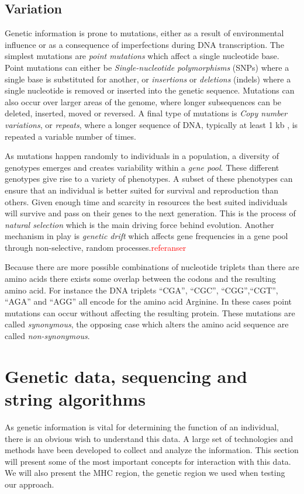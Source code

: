 \documentclass[thesis.tex]{subfiles}
\begin{document}
\subsection{Variation}
\label{sec:genetic_variation}
Genetic information is prone to mutations, either as a result of environmental influence or as a consequence of imperfections during DNA transcription. The simplest mutations are \textit{point mutations} which affect a single nucleotide base. Point mutations can either be \textit{Single-nucleotide polymorphisms} (SNPs) where a single base is substituted for another, or \textit{insertions} or \textit{deletions} (indels) where a single nucleotide is removed or inserted into the genetic sequence. Mutations can also occur over larger areas of the genome, where longer subsequences can be deleted, inserted, moved or reversed. A final type of mutations is \textit{Copy number variations}, or \textit{repeats}, where a longer sequence of DNA, typically at least 1 kb \cite{copy_number_variation_new_insights_in_genome_diversity}, is repeated a variable number of times.\\
\par\noindent
As mutations happen randomly to individuals in a population, a diversity of genotypes emerges and creates variability within a \textit{gene pool}. These different genotypes give rise to a variety of phenotypes. A subset of these phenotypes can ensure that an individual is better suited for survival and reproduction than others. Given enough time and scarcity in resources the best suited individuals will survive and pass on their genes to the next generation. This is the process of \textit{natural selection} which is the main driving force behind evolution. Another mechanism in play is \textit{genetic drift} which affects gene frequencies in a gene pool through non-selective, random processes.\textcolor{red}{referanser} \\
\par\noindent
Because there are more possible combinations of nucleotide triplets than there are amino acids there exists some overlap between the codons and the resulting amino acid. For instance the DNA triplets ``CGA'', ``CGC'', ``CGG'',``CGT'', ``AGA'' and ``AGG''  all encode for the amino acid Arginine. In these cases point mutations can occur without affecting the resulting protein. These mutations are called \textit{synonymous}, the opposing case which alters the amino acid sequence are called \textit{non-synonymous}.
\section{Genetic data, sequencing and string algorithms}
As genetic information is vital for determining the function of an individual, there is an obvious wish to understand this data. A large set of technologies and methods have been developed to collect and analyze the information. This section will present some of the most important concepts for interaction with this data. We will also present the MHC region, the genetic region we used when testing our approach.
\end{document}
